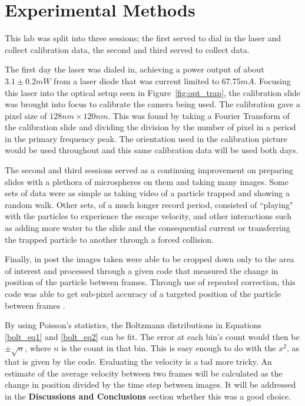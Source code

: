 \documentclass[12pt]{article}
\begin{document}
\section{Experimental Methods}
This lab was split into three sessions; the first served to dial in the laser and collect calibration data, the second and third served to collect data. 

The first day the laser was dialed in, achieving a power output of about $3.1 \pm 0.2 mW$ from a laser diode that was current limited to $67.75 mA$. Focusing this laser into the optical setup seen in Figure~\ref{fig:opt_trap}, the calibration slide was brought into focus to calibrate the camera being used. The calibration gave a pixel size of $128 nm \times 120 nm$. This was found by taking a Fourier Transform of the calibration slide and dividing the division by the number of pixel in a period in the primary frequency peak. The orientation used in the calibration picture would be used throughout and this same calibration data will be used both days. 

The second and third sessions served as a continuing improvement on preparing slides with a plethora of microspheres on them and taking many images. Some sets of data were as simple as taking video of a particle trapped and showing a random walk. Other sets, of a much longer record period, consisted of ``playing" with the particles to experience the escape velocity, and other interactions such as adding more water to the slide and the consequential current or transferring the trapped particle to another through a forced collision.

Finally, in post the images taken were able to be cropped down only to the area of interest and processed through a given code that measured the change in position of the particle between frames. Through use of repeated correction, this code was able to get sub-pixel accuracy of a targeted position of the particle between frames . 

By using Poisson's statistics, the Boltzmann distributions in Equations \ref{bolt_eq1} and \ref{bolt_eq2} can be fit. The error at each bin's count would then be $\pm \sqrt{n}$, where $n$ is the count in that bin. This is easy enough to do with the $x^2$, as that is given by the code. Evaluating the velocity is a tad more tricky. An estimate of the average velocity between two frames will be calculated as the change in position divided by the time step between images. It will be addressed in the \textbf{Discussions and Conclusions} section whether this was a good choice.
\end{document}
